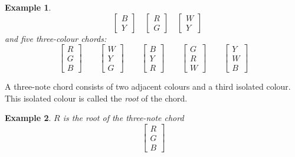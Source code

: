 \documentclass{scrartcl}
\newtheorem{example}{Example}
\begin{document}
\begin{example}
\begin{equation}
\quad
\begin{bmatrix}
B \\ Y
\end{bmatrix}
\quad
\begin{bmatrix}
R \\ G
\end{bmatrix}
\quad
\begin{bmatrix}
W \\ Y
\end{bmatrix}
\end{equation}
and five three-colour chords:
\begin{equation}\nonumber
\begin{bmatrix}
R \\ G \\ B
\end{bmatrix}
\qquad
\begin{bmatrix}
W \\ Y \\ G
\end{bmatrix}
\qquad
\begin{bmatrix}
B \\ Y \\ R
\end{bmatrix}
\qquad
\begin{bmatrix}
G \\ R \\ W
\end{bmatrix}
\qquad
\begin{bmatrix}
Y \\ W \\ B
\end{bmatrix}
\end{equation}
\end{example}
A three-note chord consists of two adjacent colours and a third isolated colour. This isolated colour is called the \emph{root} of the chord.
\begin{example}
$R$ is the root of the three-note chord %
\begin{equation}\nonumber
\begin{bmatrix}
R \\ G \\ B
\end{bmatrix}
\end{equation}
\end{example}
\end{document}
